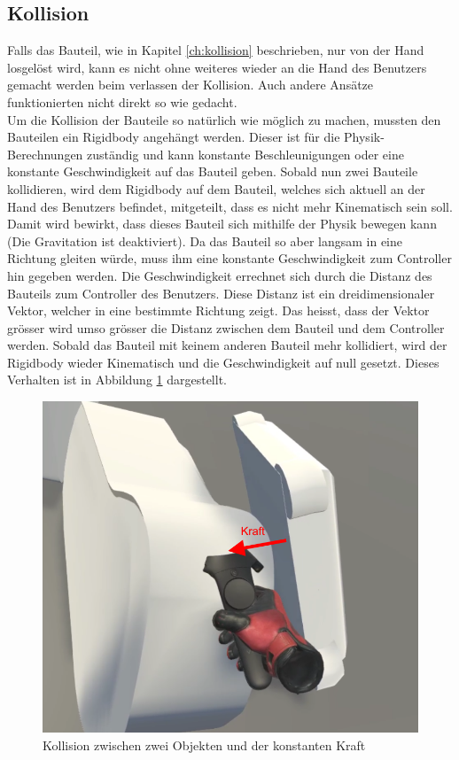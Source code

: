 \subsection{Kollision}
\label{ch:kollision_single_user}
Falls das Bauteil, wie in Kapitel \ref{ch:kollision} beschrieben, nur von der Hand losgelöst wird, kann es nicht ohne weiteres wieder an die Hand des Benutzers gemacht werden beim verlassen der Kollision. Auch andere Ansätze funktionierten nicht direkt so wie gedacht. \\

\noindent Um die Kollision der Bauteile so natürlich wie möglich zu machen, mussten den Bauteilen ein Rigidbody angehängt werden. Dieser ist für die Physik-Berechnungen zuständig und kann konstante Beschleunigungen oder eine konstante Geschwindigkeit auf das Bauteil geben. Sobald nun zwei Bauteile kollidieren, wird dem Rigidbody auf dem Bauteil, welches sich aktuell an der Hand des Benutzers befindet, mitgeteilt, dass es nicht mehr Kinematisch sein soll. Damit wird bewirkt, dass dieses Bauteil sich mithilfe der Physik bewegen kann (Die Gravitation ist deaktiviert). Da das Bauteil so aber langsam in eine Richtung gleiten würde, muss ihm eine konstante Geschwindigkeit zum Controller hin gegeben werden. Die Geschwindigkeit errechnet sich durch die Distanz des Bauteils zum Controller des Benutzers. Diese Distanz ist ein dreidimensionaler Vektor, welcher in eine bestimmte Richtung zeigt. Das heisst, dass der Vektor grösser wird umso grösser die Distanz zwischen dem Bauteil und dem Controller werden. Sobald das Bauteil mit keinem anderen Bauteil mehr kollidiert, wird der Rigidbody wieder Kinematisch und die Geschwindigkeit auf null gesetzt. Dieses Verhalten ist in Abbildung \ref{fig:collision} dargestellt.

\begin{figure}[h!]
	\centering
	\includegraphics[keepaspectratio,width=0.4\linewidth]{img/Kollision.PNG}
	\caption{Kollision zwischen zwei Objekten und der konstanten Kraft}
	\label{fig:collision}
\end{figure}

